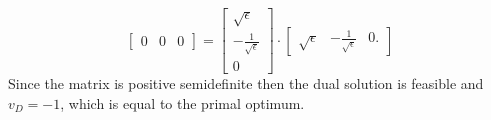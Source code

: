 \documentclass[a4paper,twoside,justified]{tufte-handout}
\begin{document}
\begin{example}
\begin{equation}
\begin{bmatrix}
      0 & 0 & 0
    \end{bmatrix} = \begin{bmatrix}
      \sqrt{\epsilon} \\
      -\frac{1}{\sqrt{\epsilon}}\\
      0
    \end{bmatrix}
    \cdot
    \begin{bmatrix}
      \sqrt{\epsilon} & -\frac{1}{\sqrt{\epsilon}} & 0.
    \end{bmatrix}
  \end{equation}
  Since the matrix is positive semidefinite then the dual solution is
  feasible and $ v_{D}=-1 $, which is equal to the primal optimum.
\end{example}





\end{document}
